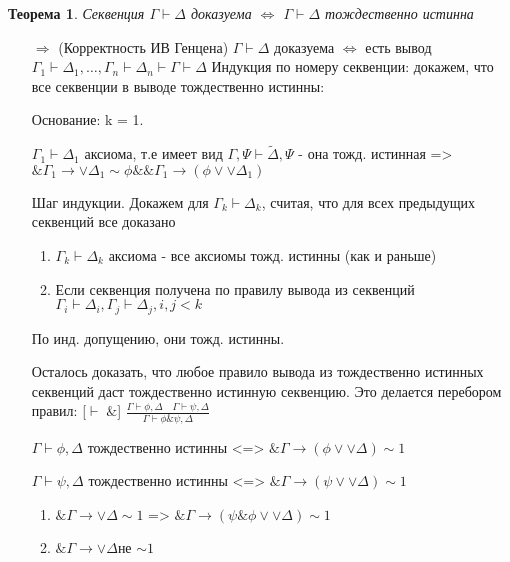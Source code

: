 \documentclass[a4paper]{article}
\newtheorem{theorem}{Теорема}[section]
\theoremstyle{definition}
\theoremstyle{remark}
\begin{document}
    \begin{theorem}
        Секвенция $\Gamma \vdash \Delta$ доказуема $\Leftrightarrow$ $\Gamma \vdash \Delta$ тождественно истинна
    \end{theorem}
    \begin{itemize}
        \item[$\Rightarrow$] (Корректность ИВ Генцена)
        $\Gamma \vdash \Delta$ доказуема $\Leftrightarrow$ есть вывод
        $\Gamma_1\vdash \Delta_1, \dots, \Gamma_n\vdash \Delta_n\vdash \Gamma\vdash \Delta$
        Индукция по номеру секвенции:
        докажем, что все секвенции в выводе тождественно истинны:

        Основание: k = 1.

        $\Gamma_1\vdash \Delta_1$ аксиома, т.е имеет вид $\Gamma, \Psi\vdash \widetilde{\Delta}, \Psi $ - 
        она тожд. истинная =>
        $\& \Gamma_1 \to \vee \Delta_1 \sim \phi \& \& \Gamma_1 \to (\phi\vee \vee\Delta_1)$

        Шаг индукции. Докажем для $\Gamma_k\vdash \Delta_k$, считая, что для всех предыдущих секвенций все доказано
        \begin{enumerate}
            \item $\Gamma_k\vdash \Delta_k$ аксиома - все аксиомы тожд. истинны (как и раньше)
            \item Если секвенция получена по правилу вывода из секвенций $\Gamma_i\vdash \Delta_i, \Gamma_j\vdash \Delta_j, i, j < k$
        \end{enumerate}
        По инд. допущению, они тожд. истинны.

        Осталось доказать, что любое правило вывода из тождественно истинных секвенций даст тождественно истинную секвенцию.
        Это делается перебором правил:
        [$\vdash\;\&$] $\frac{\Gamma \vdash \phi, \Delta \quad \Gamma \vdash \psi, \Delta}{\Gamma \vdash \phi\&\psi, \Delta}$

        $\Gamma \vdash \phi, \Delta$ тождественно истинны <=> $\& \Gamma \to (\phi\vee \vee\Delta)\sim 1$

        $\Gamma \vdash \psi, \Delta$ тождественно истинны <=> $\& \Gamma \to (\psi\vee \vee\Delta)\sim 1$

        \begin{enumerate}
            \item $\& \Gamma \to \vee \Delta \sim 1$ => $\& \Gamma \to (\psi\&\phi\vee\vee\Delta)\sim 1$
            \item $\& \Gamma \to \vee \Delta $не $\sim 1$
            

\end{enumerate}
\end{itemize}
\end{document}
